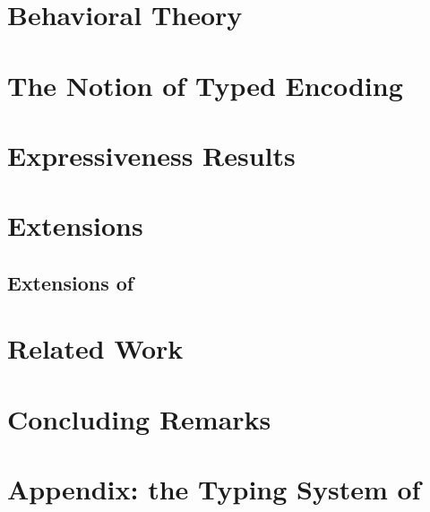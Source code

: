 \documentclass[runningheads]{llncs}
\begin{document}



\section{Behavioral Theory}


%



\section{The Notion of Typed Encoding}
\label{s:expr}


\section{Expressiveness Results}
\label{sec:positive}


\section{Extensions}
\label{sec:extension}
\subsection{Extensions of \HOp}





%

\section{Related Work}
\label{sec:relwork}


\section{Concluding Remarks}
\label{sec:concl}



%

{}


\newpage
\onecolumn
\setcounter{tocdepth}{4}
\tableofcontents

\appendix 
\section{Appendix: the Typing System of \HOp}
\label{app:types}

%



\end{document}
